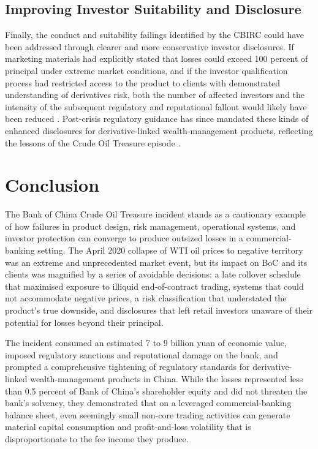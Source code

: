 \documentclass[a4paper,11pt]{article}
\begin{document}
\subsection{Improving Investor Suitability and Disclosure}

Finally, the conduct and suitability failings identified by the CBIRC
could have been addressed through clearer and more conservative
investor disclosures. If marketing materials had explicitly stated
that losses could exceed 100 percent of principal under extreme
market conditions, and if the investor qualification process had
restricted access to the product to clients with demonstrated
understanding of derivatives risk, both the number of affected
investors and the intensity of the subsequent regulatory and
reputational fallout would likely have been reduced
\cite{caixin2020bitter}. Post-crisis regulatory guidance has since
mandated these kinds of enhanced disclosures for derivative-linked
wealth-management products, reflecting the lessons of the Crude Oil
Treasure episode \cite{reuters2020fined}.

\section{Conclusion}

The Bank of China Crude Oil Treasure incident stands as a cautionary
example of how failures in product design, risk management,
operational systems, and investor protection can converge to produce
outsized losses in a commercial-banking setting. The April 2020
collapse of WTI oil prices to negative territory was an extreme and
unprecedented market event, but its impact on BoC and its clients was
magnified by a series of avoidable decisions: a late rollover
schedule that maximised exposure to illiquid end-of-contract trading,
systems that could not accommodate negative prices, a risk
classification that understated the product's true downside, and
disclosures that left retail investors unaware of their potential for
losses beyond their principal.

The incident consumed an estimated 7 to 9 billion yuan of economic
value, imposed regulatory sanctions and reputational damage on the
bank, and prompted a comprehensive tightening of regulatory standards
for derivative-linked wealth-management products in China. While the
losses represented less than 0.5 percent of Bank of China's
shareholder equity and did not threaten the bank's solvency, they
demonstrated that on a leveraged commercial-banking balance sheet,
even seemingly small non-core trading activities can generate
material capital consumption and profit-and-loss volatility that is
disproportionate to the fee income they produce.
\end{document}

